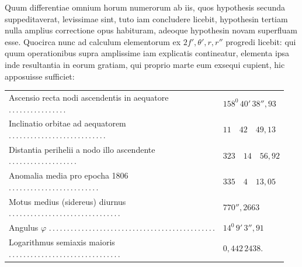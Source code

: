 Quum differentiae omnium horum numerorum ab iis, quos hypothesis secunda suppeditaverat, levissimae sint, tuto iam concludere licebit, hypothesin tertiam nulla amplius correctione opus habituram, adeoque hypothesin novam superfluam esse. Quocirca nunc ad calculum elementorum ex $2f',\theta',r,r''$ progredi licebit: qui quum operationibus supra amplissime iam explicatis contineatur, elementa ipsa inde resultantia in eorum gratiam, qui proprio marte eum exsequi cupient, hic apposuisse sufficiet:
\begin{center}\begingroup\footnotesize\setlength{\tabcolsep}{3pt}\renewcommand{\arraystretch}{1.3}
\begin{tabular}{ll}
\shortstack{Ascensio recta nodi ascendentis in aequatore\\.\,.\,.\,.\,.\,.\,.\,.\,.\,.\,.\,.\,.\,.\,.\,.} & $158^0\,40'\,38''{,}93$\\
\shortstack{Inclinatio orbitae ad aequatorem\\.\,.\,.\,.\,.\,.\,.\,.\,.\,.\,.\,.\,.\,.\,.\,.\,.\,.\,.\,.\,.\,.\,.\,.\,.\,.\,.} & $11\quad42\quad49{,}13$\\
\shortstack{Distantia perihelii a nodo illo ascendente\\.\,.\,.\,.\,.\,.\,.\,.\,.\,.\,.\,.\,.\,.\,.\,.\,.\,.\,.} & $323\quad14\quad56{,}92$\\
\shortstack{Anomalia media pro epocha 1806\\.\,.\,.\,.\,.\,.\,.\,.\,.\,.\,.\,.\,.\,.\,.\,.\,.\,.\,.\,.\,.\,.\,.\,.\,.} & $335\quad4\quad13{,}05$\\
\shortstack{Motus medius (sidereus) diurnus\\.\,.\,.\,.\,.\,.\,.\,.\,.\,.\,.\,.\,.\,.\,.\,.\,.\,.\,.\,.\,.\,.\,.\,.\,.\,.\,.\,.\,.\,.\,.} & $770''{,}2663$\\
\shortstack{Angulus $\varphi$\\.\,.\,.\,.\,.\,.\,.\,.\,.\,.\,.\,.\,.\,.\,.\,.\,.\,.\,.\,.\,.\,.\,.\,.\,.\,.\,.\,.\,.\,.\,.\,.\,.\,.\,.\,.\,.\,.\,.\,.\,.\,.\,.\,.\,.\,.} & $14^0\,9'\,3''{,}91$\\
\shortstack{Logarithmus semiaxis maioris\\.\,.\,.\,.\,.\,.\,.\,.\,.\,.\,.\,.\,.\,.\,.\,.\,.\,.\,.\,.\,.\,.\,.\,.\,.\,.\,.\,.\,.\,.\,.} & $0{,}442\,2438$.
\end{tabular}\endgroup\end{center}
